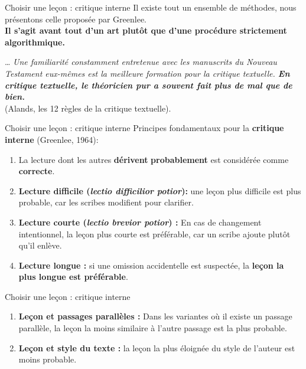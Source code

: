 \documentclass[11pt]{beamer}
\begin{document}


\begin{frame}{Choisir une leçon : critique interne}
Il existe tout un ensemble de méthodes, nous présentons celle proposée par Greenlee. \\

\textbf{Il s'agit avant tout d'un art plutôt que d'une procédure strictement algorithmique.}
\vfill

\begin{alertblock}{}
         \dots
        \textit{Une familiarité constamment entretenue avec les manuscrits du Nouveau Testament eux-mêmes est la meilleure formation pour la critique textuelle. \textbf{En critique textuelle, le théoricien pur a souvent fait plus de mal que de bien.}}\\
        (Alands, les 12 règles de la critique textuelle).
    \end{alertblock}
    
\end{frame}

\begin{frame}{Choisir une leçon : critique interne}
    Principes fondamentaux pour la \textbf{critique interne} (Greenlee, 1964):\\
\begin{enumerate}
\item La lecture dont les autres \textbf{dérivent} \textbf{probablement} est considérée comme \textbf{correcte}.

    \item \textbf{Lecture difficile (\textit{lectio difficilior potior}):} une leçon plus difficile est plus probable, car les scribes modifient pour clarifier.
    
    \item \textbf{Lecture courte (\textit{lectio brevior potior}) :} 
    En cas de changement intentionnel, la leçon plus courte est préférable, car un scribe ajoute plutôt qu'il enlève.

    \item \textbf{Lecture longue :} si une omission accidentelle est suspectée, la \textbf{leçon la plus longue est préférable}.
\end{enumerate}

\end{frame}

\begin{frame}{Choisir une leçon : critique interne}

\begin{enumerate}
    \item \textbf{Leçon et passages parallèles :} Dans les variantes où il existe un passage parallèle, la leçon la moins similaire à l'autre passage est la plus probable.
    \item \textbf{Leçon et style du texte :} la leçon la plus éloignée du style de l'auteur est moins probable.
\end{enumerate}

\end{frame}
\end{document}
